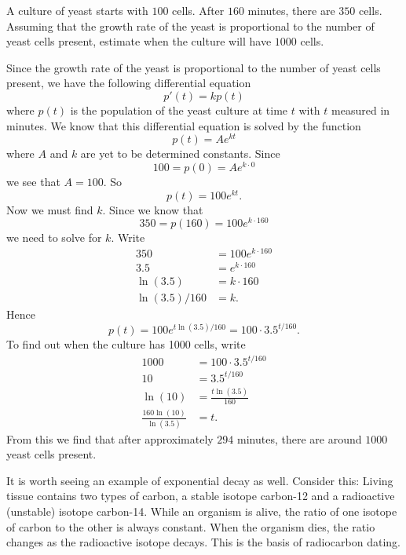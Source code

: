 \documentclass{ximera}
\begin{document}
\begin{example}
A culture of yeast starts with $100$ cells. After $160$ minutes, there
are $350$ cells. Assuming that the growth rate of the yeast is
proportional to the number of yeast cells present, estimate when the
culture will have $1000$ cells.

\begin{explanation}
Since the growth rate of the yeast is proportional to the number of
yeast cells present, we have the following differential equation
\[
p'(t) = k p(t)
\]
where $p(t)$ is the population of the yeast culture at time $t$ with
$t$ measured in minutes. We know that this differential equation is
solved by the function
\[
p(t) = A e^{kt}
\]
where $A$ and $k$ are yet to be determined constants. Since
\[
100 = p(0) = Ae^{k\cdot 0}
\]
we see that $A = 100$. So 
\[
p(t) = 100 e^{kt}.
\]
Now we must find $k$. Since we know that 
\[
350 = p(160) = 100e^{k\cdot 160}
\]
we need to solve for $k$. Write
\begin{align*}
350 &= 100 e^{k\cdot 160}\\
3.5 &= e^{k\cdot 160}\\
\ln(3.5) &= k\cdot 160\\
\ln(3.5)/160 &= k. 
\end{align*}
Hence
\[
p(t) = 100 e^{t\ln(3.5)/160} = 100 \cdot 3.5^{t/160}.
\]
To find out when the culture has 1000 cells, write
\begin{align*}
1000 &= 100 \cdot 3.5^{t/160}\\
10 &= 3.5^{t/160}\\
\ln(10) &= \frac{t\ln(3.5)}{160}\\
\frac{160\ln(10)}{\ln(3.5)} &= t.
\end{align*}
From this we find that after approximately $294$ minutes, there are
around $1000$ yeast cells present.
\end{explanation}
\end{example}

It is worth seeing an example of exponential decay as well. Consider
this: Living tissue contains two types of carbon, a stable isotope
carbon-12 and a radioactive (unstable) isotope carbon-14. While an
organism is alive, the ratio of one isotope of carbon to the other is
always constant. When the organism dies, the ratio changes as the
radioactive isotope decays.  This is the basis of radiocarbon dating.
\end{document}
